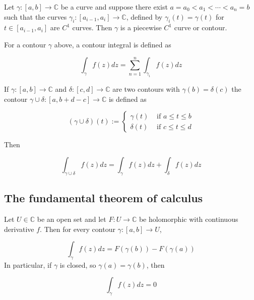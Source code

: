 \begin{definition}
	Let $\gamma: [a, b] \rightarrow \mathbb{C}$ be a curve and suppose there exist $a = a_0 < a_1 < \cdots < a_n = b$ such that the curves $\gamma_i: [a_{i - 1}, a_i] \rightarrow \mathbb{C}$, defined by $\gamma_i(t) = \gamma(t)$ for $t \in [a_{i - 1}, a_i]$ are $C^1$ curves. Then $\gamma$ is a piecewise $C^1$ curve or contour.

	For a contour $\gamma$ above, a contour integral is defined as

	\[ \int_{\gamma} f(z) dz = \sum_{n = 1}^n \int_{\gamma_i} f(z) dz \]
\end{definition}

\begin{definition}
	If $\gamma: [a, b] \rightarrow \mathbb{C}$ and $\delta: [c, d] \rightarrow \mathbb{C}$ are two contours with $\gamma(b) = \delta(c)$ the contour $\gamma \cup \delta: [a, b + d - c] \rightarrow \mathbb{C}$ is defined as

	\[ (\gamma \cup \delta)(t) := \begin{cases}
		\gamma(t) & \text{ if } a \le t \le b \\
		\delta(t) & \text{ if } c \le t \le d
	\end{cases} \]

	Then

	\[ \int_{\gamma \cup \delta} f(z) dz = \int_{\gamma} f(z) dz + \int_{\delta} f(z) dz \]
\end{definition}

\subsection{The fundamental theorem of calculus}

\begin{theorem}
	Let $U \in \mathbb{C}$ be an open set and let $F: U \rightarrow \mathbb{C}$ be holomorphic with continuous derivative $f$. Then for every contour $\gamma: [a, b] \rightarrow U$,

	\[ \int_{\gamma} f(z) dz = F(\gamma(b)) - F(\gamma(a)) \]
	In particular, if $\gamma$ is closed, so $\gamma(a) = \gamma(b)$, then

	\[ \int_{\gamma} f(z) dz = 0 \]
\end{theorem}

